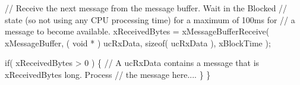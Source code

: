 \begin{DoxyPre} // Receive the next message from the message buffer.  Wait in the Blocked
 // state (so not using any CPU processing time) for a maximum of 100ms for
 // a message to become available.
 xReceivedBytes = xMessageBufferReceive( xMessageBuffer,
                                         ( void * ) ucRxData,
                                         sizeof( ucRxData ),
                                         xBlockTime );\end{DoxyPre}



\begin{DoxyPre} if( xReceivedBytes > 0 )
 \{
     // A ucRxData contains a message that is xReceivedBytes long.  Process
     // the message here....
 \}
\}
\end{DoxyPre}
 